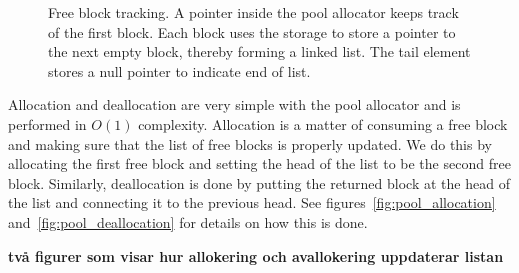 \documentclass{article}
\begin{document}
\begin{figure}[h]
    \centering
    \caption{Free block tracking. A pointer inside the pool allocator keeps track of the first block. Each block uses the storage to store a pointer to the next empty block, thereby forming a linked list. The tail element stores a null pointer to indicate end of list.}
    \label{fig:pool_free_blocks}
\end{figure}

Allocation and deallocation are very simple with the pool allocator and is performed in $O(1)$ complexity. Allocation is a matter of consuming a free block and making sure that the list of free blocks is properly updated. We do this by allocating the first free block and setting the head of the list to be the second free block. Similarly, deallocation is done by putting the returned block at the head of the list and connecting it to the previous head. See figures~\ref{fig:pool_allocation} and~\ref{fig:pool_deallocation} for details on how this is done.

\textbf{\large två figurer som visar hur allokering och avallokering uppdaterar listan}
\end{document}
